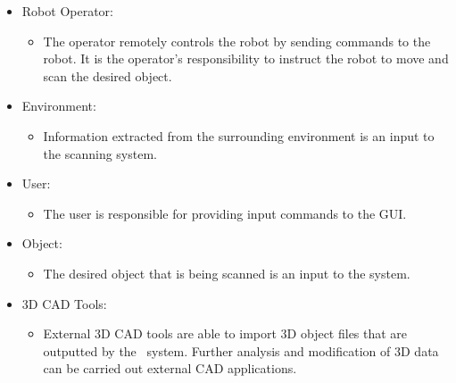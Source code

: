 \documentclass[12pt]{article}
\begin{document}

\begin{itemize}
\item Robot Operator:
\begin{itemize}
\item The operator remotely controls the robot by sending commands to the robot. It is the operator's responsibility to instruct the robot to move and scan the desired object. 
\end{itemize}
\end{itemize}

\begin{itemize}
\item Environment:
\begin{itemize}
\item Information extracted from the surrounding environment is an input to the scanning system.
\end{itemize}
\end{itemize}

\begin{itemize}
\item User: 
\begin{itemize}
\item The user is responsible for providing input commands to the GUI. 
\end{itemize}
\end{itemize}

\begin{itemize}
\item Object:
\begin{itemize}
\item The desired object that is being scanned is an input to the system.
\end{itemize}
\end{itemize}

\begin{itemize}
\item 3D CAD Tools:
\begin{itemize}
\item External 3D CAD tools are able to import 3D object files that are outputted by the \progname\ system. Further analysis and modification of 3D data can be carried out external CAD applications.
\end{itemize}
\end{itemize}
\end{document}
